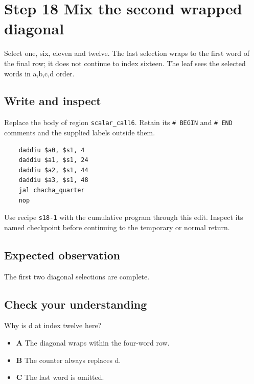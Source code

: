 \section{Step 18 Mix the second wrapped diagonal}\label{chacha-s18}

Select one, six, eleven and twelve. The last selection wraps to the first word of the final row; it does not continue to index sixteen. The leaf sees the selected words in a,b,c,d order.

\subsection{Write and inspect}
Replace the body of region \texttt{scalar\_call6}. Retain its \texttt{\# BEGIN} and \texttt{\# END} comments and the supplied labels outside them.

\begin{verbatim}
    daddiu $a0, $s1, 4
    daddiu $a1, $s1, 24
    daddiu $a2, $s1, 44
    daddiu $a3, $s1, 48
    jal chacha_quarter
    nop
\end{verbatim}

Use recipe \texttt{s18-1} with the cumulative program through this edit. Inspect its named checkpoint before continuing to the temporary or normal return.

\subsection{Expected observation}
The first two diagonal selections are complete.

\subsection{Check your understanding}
Why is d at index twelve here?

\begin{itemize}
  \item \textbf{A} The diagonal wraps within the four-word row.
  \item \textbf{B} The counter always replaces d.
  \item \textbf{C} The last word is omitted.
\end{itemize}
